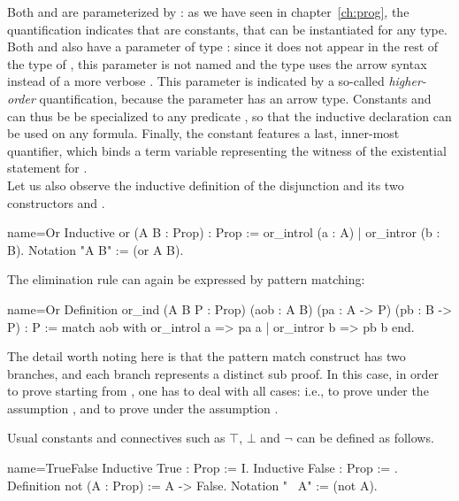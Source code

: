 Both  and  are parameterized by : as
we have seen in chapter~\ref{ch:prog}, the 
quantification indicates that  are  
constants, that can be instantiated for any type. Both  and
 also have a parameter of type  : since it
does not appear in the rest of the type of , this parameter is
not named and the type uses the arrow syntax instead of a more verbose
. This parameter is
indicated by a so-called \emph{higher-order} quantification, because
the parameter has an arrow type. Constants   and 
can thus be  be specialized to any predicate , so that the 
inductive declaration can be used on any formula. Finally, the
 constant features a last, inner-most 
quantifier, which binds a term variable  representing the witness
of the existential statement for .\\

Let us also observe the inductive definition of the disjunction 
and its two constructors  and .

\begin{coq}{name=Or}{}
Inductive or (A B : Prop) : Prop := or_introl (a : A) | or_intror (b : B).
Notation "A \/ B" := (or A B).
\end{coq}

The elimination rule can again be expressed by pattern matching:

\begin{coq}{name=Or}{}
Definition or_ind (A B P : Prop)
  (aob : A \/ B) (pa : A -> P) (pb : B -> P) : P :=
  match aob with or_introl a => pa a | or_intror b => pb b end.
\end{coq}

The detail worth noting here is that the pattern match construct has two
branches, and each branch represents a distinct sub proof.  In this
case, in order to prove  starting from ,
one has to deal with all cases: i.e., to prove  under the
assumption , and to prove 
under the assumption .

Usual constants and connectives such as $\top$, $\bot$ and $\neg$
can be defined as follows.

\begin{coq}{name=TrueFalse}{}
Inductive True : Prop := I.
Inductive False : Prop := .
Definition not (A : Prop) := A -> False.
Notation "~ A" := (not A).
\end{coq}

